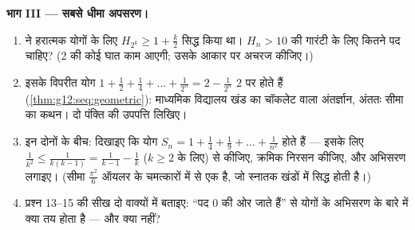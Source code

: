 \begin{problem}
\medskip
\noindent\textbf{भाग III --- सबसे धीमा अपसरण।}
\begin{enumerate}[resume]
  \item {} ने हरात्मक योगों के लिए $H_{2^k} \geq 1 + \frac k2$ सिद्ध किया था। $H_n > 10$ की गारंटी
        के लिए कितने पद चाहिए? (2 की कोई घात काम आएगी; उसके आकार पर अचरज
        कीजिए।)
  \item इसके विपरीत  योग $1 + \frac12 + \frac14 + \dots + \frac{1}{2^n} =
        2 - \frac{1}{2^n}$ $2$ पर  होते हैं (\cref{thm:g12:seq:geometric}):
        माध्यमिक विद्यालय खंड का चॉकलेट वाला अंतर्ज्ञान, अंततः सीमा का
        कथन। दो पंक्ति की उपपत्ति लिखिए।
  \item इन दोनों के बीच: दिखाइए कि योग $S_n = 1 + \frac{1}{4} + \frac{1}{9} + \dots +
        \frac{1}{n^2}$  होते हैं --- इसके लिए
        $\frac{1}{k^2} \leq \frac{1}{k(k-1)} =
        \frac{1}{k-1} - \frac{1}{k}$ ($k \geq 2$ के लिए) से  कीजिए, क्रमिक निरसन कीजिए, और
         अभिसरण लगाइए। (सीमा $\frac{\pi^2}{6}$ ऑयलर के चमत्कारों में से एक है,
        जो स्नातक खंडों में सिद्ध होती है।)
  \item प्रश्न 13--15 की सीख दो वाक्यों में बताइए: ``पद $0$ की ओर जाते
        हैं'' से योगों के अभिसरण के बारे में क्या तय होता है --- और क्या
        नहीं?
\end{enumerate}


\end{problem}
